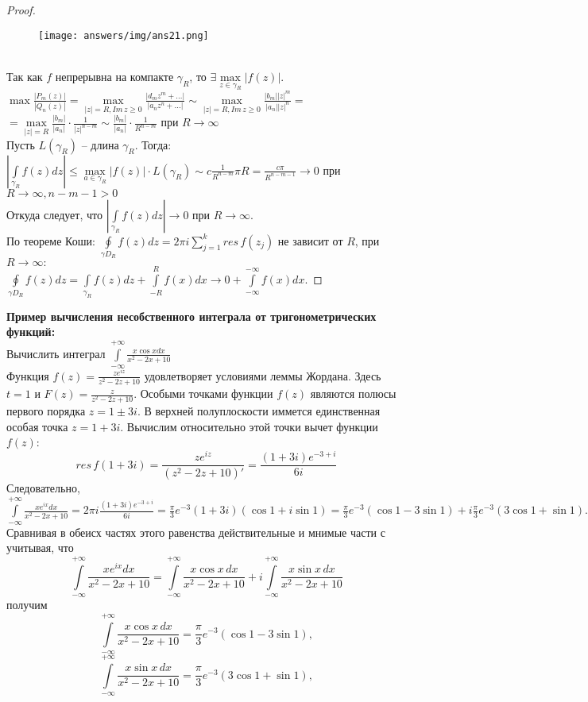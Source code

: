 \begin{proof}
    \ \\
    \begin{figure}[h]
        \centering
        \texttt{[image: answers/img/ans21.png]}
    \end{figure}\\[2mm]

    Так как $f$ непрерывна на компакте $\gamma_R$, то $\exists \underset{z\in \gamma_R}{\max} |f(z)|$.\\[2mm]
    $\max\frac{|P_m(z)|}{|Q_n(z)|}=\underset{|z|=R, Im\,z\geq0}{\max} \frac{|d_mz^m+...|}{|a_nz^n+...|} \sim{} \underset{|z|=R, Im\,z\geq0}{\max} \frac{|b_m||z|^m}{|a_n||z|^n}= $\\[2mm]
    $=\underset{|z|=R}{\max}\frac{|b_m|}{|a_n|}\cdot\frac{1}{|z|^{n-m}}\sim{} \frac{|b_m|}{|a_n|}\cdot \frac{1}{R^{n-m}}$ при $R\to \infty$\\[2mm]
    Пусть $L(\gamma_R)$ -- длина $\gamma_R$. Тогда:\\[2mm]
    $\left|\int\limits_{\gamma_R}f(z)dz\right|\leq \underset{a\in\gamma_R}{\max}|f(z)|\cdot L(\gamma_R)\sim c\frac{1}{R^{n-m}}\pi R = \frac{c\pi}{R^{n-m-1}}\to 0$ при $R\to \infty, n-m-1>0$\\[2mm]
    Откуда следует, что $\left|\int\limits_{\gamma_R} f(z)dz\right| \to 0$ при $R\to \infty$.\\[2mm]
    По теореме Коши: $\oint\limits_{\gamma D_R}f(z)dz = 2\pi i \sum\limits_{j=1}^k res\, f(z_j)$ не зависит от $R$, при $R\to \infty:$\\[2mm]
    $\oint\limits_{\gamma D_R}f(z)dz = \int\limits_{\gamma_R}f(z)dz + \int\limits_{-R}^R f(x)dx \to 0+\int\limits_{-\infty}^{-\infty}f(x)dx$.
\end{proof}


\newpage
\textbf{Пример вычисления несобственного интеграла от тригонометрических функций:}\\
Вычислить интеграл $\int\limits_{-\infty}^{+\infty} \frac{x\cos x dx}{x^2-2x+10}$\\
Функция $f(z)=\frac{ze^{iz}}{z^2-2z+10}$ удовлетворяет условиями леммы Жордана. Здесь $t=1$ и $F(z)=\frac{z}{z^2-2z+10}$. Особыми точками функции $f(z)$ являются полюсы первого порядка $z=1\pm 3i$. В верхней полуплоскости иммется единственная особая точка $z=1+3i$. Вычислим относительно этой точки вычет функции $f(z)$:
$$res\, f(1+3i) = \frac{ze^{iz}}{(z^2-2z+10)'}=\frac{(1+3i)e^{-3+i}}{6i}$$
Следовательно, $\int\limits_{-\infty}^{+\infty} \frac{xe^{ix}dx}{x^2-2x+10}=2\pi i \frac{(1+3i)e^{-3+i}}{6i} = \frac{\pi}{3}e^{-3}(1+3i)(\cos 1+i\sin 1)=\frac{\pi}{3} e^{-3}(\cos 1 - 3\sin 1)+i\frac{\pi}{3}e^{-3}(3\cos 1+\sin 1).$\\
Сравнивая в обеисх частях этого равенства действительные и мнимые части с учитывая, что $$\int\limits_{-\infty}^{+\infty}\frac{xe^{ix}dx}{x^2-2x+10}=\int\limits_{-\infty}^{+\infty}\frac{x\cos x\, dx}{x^2-2x+10}+i\int\limits_{-\infty}^{+\infty}\frac{x\sin x\, dx}{x^2-2x+10}$$ 
получим $$\int\limits_{-\infty}^{+\infty}\frac{x\cos x\, dx}{x^2-2x+10} = \frac{\pi}{3}e^{-3}(\cos 1-3\sin 1),$$
$$\int\limits_{-\infty}^{+\infty}\frac{x\sin x\, dx}{x^2-2x+10} = \frac{\pi}{3}e^{-3}(3\cos 1+\sin 1),$$
